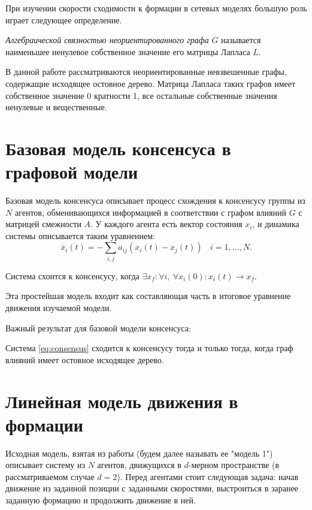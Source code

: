 При изучении скорости сходимости к формации в сетевых моделях большую роль играет следующее определение.

\begin{definition}
\emph{Алгебраической связностью неориентированного графа} $G$ называется наименьшее ненулевое собственное значение его матрицы Лапласа $L$.
\end{definition}

В данной работе рассматриваются неориентированные невзвешенные графы, содержащие исходящее остовное дерево. Матрица Лапласа таких графов имеет собственное значение 0 кратности 1, все остальные собственные значения ненулевые и вещественные.

\section{Базовая модель консенсуса в графовой модели}

Базовая модель консенсуса описывает процесс схождения к консенсусу группы из $N$ агентов, обменивающихся информацией в соответствии с графом влияний $G$ с матрицей смежности $A$. У каждого агента есть вектор состояния $x_i$, и динамика системы описывается таким уравнением:
\begin{equation}
\label{eq:consensus}
\dot{x_i}(t)=-\sum_{i,j}a_{ij}\left(x_i(t)-x_j(t)\right)\ \ \ \ i=1,\ldots,N.
\end{equation}

Система схоится к консенсусу, когда $\exists x_f: \forall i,\ \forall x_i(0): x_i(t)\rightarrow x_f.$

Эта простейшая модель входит как составляющая часть в итоговое уравнение движения изучаемой модели.

Важный результат для базовой модели консенсуса:
\begin{theorem}
Система \ref{eq:consensus} сходится к консенсусу тогда и только тогда, когда граф влияний имеет остовное исходящее дерево. 
\end{theorem}

\section{Линейная модель движения в формации}
Исходная модель, взятая из работы \cite{veerman2005flocks} (будем далее называть ее "модель 1") описывает систему из $N$ агентов, движущихся в $d$-мерном пространстве (в рассматриваемом случае $d=2$). Перед агентами стоит следующая задача: начав движение из заданной позиции с заданными скоростями, выстроиться в заранее заданную формацию и продолжить движение в ней. 

